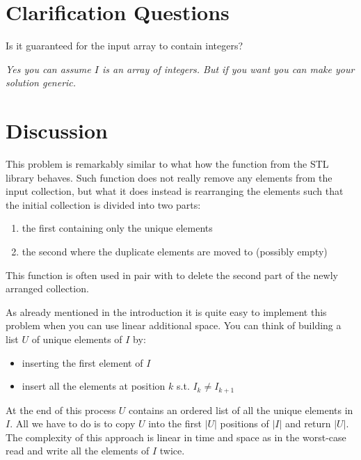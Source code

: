 \section{Clarification Questions}

\begin{QandA}
	\item Is it guaranteed for the input array to  contain integers? 
	\begin{answered}
		\textit{Yes you can assume $I$ is an array of integers. But if you want you can make your solution generic.}
	\end{answered}	
\end{QandA}

\section{Discussion}
\label{remove_duplicated_sorted_array_inplace:sec:discussion}
This problem is remarkably similar to what how the function  from the STL library behaves. 
Such function does not really remove any elements from the input collection, but what it does instead is rearranging the elements
such that the initial collection is divided into two parts:
\begin{enumerate}
	\item the first containing only the unique elements
	\item the second where the duplicate elements are moved to (possibly empty)
\end{enumerate}
This function is often used in pair with  to delete the second part of the newly arranged collection.

As already mentioned in the introduction it is quite easy to implement this problem when you can use linear additional space.
You can think of building a list $U$ of unique elements of $I$ by:
\begin{itemize}
	\item inserting the first element of $I$
	\item insert all the elements at position $k$ s.t. $I_k \neq I_{k+1}$
\end{itemize}
At the end of this process $U$ contains an ordered list of all the unique elements in $I$. All we have to do is to copy $U$ into the first $|U|$ positions of $|I|$ and return $|U|$.
The complexity of this approach is linear in time and space as in the worst-case read and write all the elements of $I$ twice.

